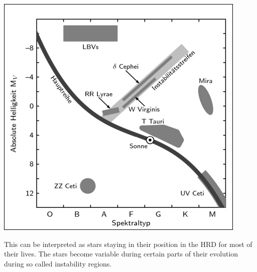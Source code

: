 \documentclass[11pt,a4paper]{article}
\begin{document}
\begin{center}
    \includegraphics[width=0.6\linewidth]{screenshot_2024-01-21-173647.png}
\end{center}
This can be interpreted as stars staying in their position in the HRD for most of their lives.
The stars become variable during certain parts of their evolution during so called instability regions.
\end{document}
